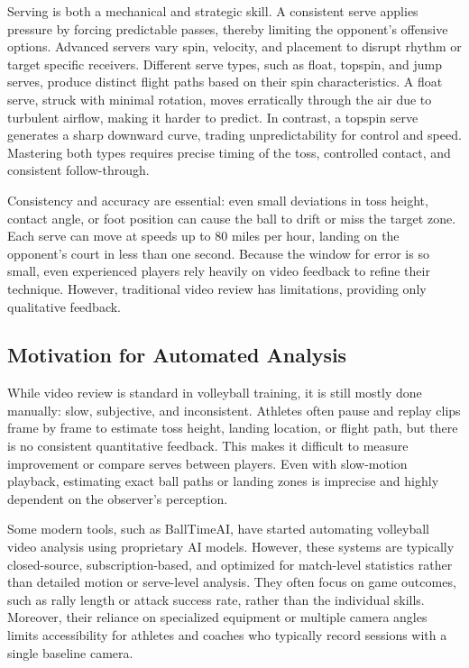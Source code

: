 Serving is both a mechanical and strategic skill. A consistent serve applies pressure by forcing predictable passes, thereby limiting the opponent's offensive options. Advanced servers vary spin, velocity, and placement to disrupt rhythm or target specific receivers. Different serve types, such as float, topspin, and jump serves, produce distinct flight paths based on their spin characteristics. A float serve, struck with minimal rotation, moves erratically through the air due to turbulent airflow, making it harder to predict. In contrast, a topspin serve generates a sharp downward curve, trading unpredictability for control and speed. Mastering both types requires precise timing of the toss, controlled contact, and consistent follow-through.

Consistency and accuracy are essential: even small deviations in toss height, contact angle, or foot position can cause the ball to drift or miss the target zone. Each serve can move at speeds up to 80 miles per hour, landing on the opponent's court in less than one second. Because the window for error is so small, even experienced players rely heavily on video feedback to refine their technique. However, traditional video review has limitations, providing only qualitative feedback.

\subsection{Motivation for Automated Analysis}
While video review is standard in volleyball training, it is still mostly done manually: slow, subjective, and inconsistent. Athletes often pause and replay clips frame by frame to estimate toss height, landing location, or flight path, but there is no consistent quantitative feedback. This makes it difficult to measure improvement or compare serves between players. Even with slow-motion playback, estimating exact ball paths or landing zones is imprecise and highly dependent on the observer's perception.

Some modern tools, such as BallTimeAI, have started automating volleyball video analysis using proprietary AI models. However, these systems are typically closed-source, subscription-based, and optimized for match-level statistics rather than detailed motion or serve-level analysis. They often focus on game outcomes, such as rally length or attack success rate, rather than the individual skills. Moreover, their reliance on specialized equipment or multiple camera angles limits accessibility for athletes and coaches who typically record sessions with a single baseline camera.

